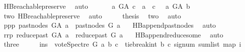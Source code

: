 \begin{isabellebody}
\ HB{}{\isachardot}{\kern0pt}reachable{}{\isacharunderscore}{\kern0pt}preserve\ \isamarkupfalse%
\ auto\isanewline
\ \ \isamarkupfalse%
\ \isamarkupfalse%
\ {\isachardoublequoteopen}\ {\isacharparenleft}{\kern0pt}a\ {\isasymrightarrow}\isactrlsup {\isacharplus}{\kern0pt}\isactrlbsub G{\isacharunderscore}{\kern0pt}A\isactrlesub \ c\ {\isasymor}\ a\ {\isacharequal}{\kern0pt}\ c{\isacharparenright}{\kern0pt}\ {\isasymand}\ {\isacharparenleft}{\kern0pt}{\isasymnot}\ a\ {\isasymrightarrow}\isactrlsup {\isacharplus}{\kern0pt}\isactrlbsub G{\isacharunderscore}{\kern0pt}A\isactrlesub \ b{\isacharparenright}{\kern0pt}{\isachardoublequoteclose}\ \isanewline
\ \ \ \ \isamarkupfalse%
\ two\ HB{}{\isachardot}{\kern0pt}reachable{}{\isacharunderscore}{\kern0pt}preserve\ \isamarkupfalse%
\ auto\isanewline
\ \ \isamarkupfalse%
\ \isamarkupfalse%
\ {\isacharquery}{\kern0pt}thesis\ \isamarkupfalse%
\ two\ \isamarkupfalse%
\ auto\isanewline
{}\isamarkupfalse%
\isanewline
\ \ \isamarkupfalse%
\ ppp{\isacharcolon}{\kern0pt}\ {\isachardoublequoteopen}past{\isacharunderscore}{\kern0pt}nodes\ G{\isacharunderscore}{\kern0pt}A\ a\ {\isacharequal}{\kern0pt}\ past{\isacharunderscore}{\kern0pt}nodes\ G\ a{\isachardoublequoteclose}\ \isamarkupfalse%
\ {}{\isacharparenleft}{\kern0pt}{}{\isacharparenright}{\kern0pt}\ HB{}{\isachardot}{\kern0pt}append{\isacharunderscore}{\kern0pt}past{\isacharunderscore}{\kern0pt}nodes\ \isamarkupfalse%
\ auto\isanewline
\ \ \isamarkupfalse%
\ rrp{\isacharcolon}{\kern0pt}\ {\isachardoublequoteopen}reduce{\isacharunderscore}{\kern0pt}past\ G{\isacharunderscore}{\kern0pt}A\ a\ {\isacharequal}{\kern0pt}\ reduce{\isacharunderscore}{\kern0pt}past\ G\ a{\isachardoublequoteclose}\ \isamarkupfalse%
\ {}{\isacharparenleft}{\kern0pt}{}{\isacharparenright}{\kern0pt}\ HB{}{\isachardot}{\kern0pt}append{\isacharunderscore}{\kern0pt}reduce{\isacharunderscore}{\kern0pt}some\ \isamarkupfalse%
\ auto\isanewline
\ \ \isamarkupfalse%
\ three\isanewline
\ \ \isamarkupfalse%
\ \isamarkupfalse%
\ ins{\isacharcolon}{\kern0pt}\ {\isachardoublequoteopen}\ vote{\isacharunderscore}{\kern0pt}Spectre\ G\ a\ b\ c\ {\isacharequal}{\kern0pt}\ {\isacharparenleft}{\kern0pt}tie{\isacharunderscore}{\kern0pt}break{\isacharunderscore}{\kern0pt}int\ b\ c\ {\isacharparenleft}{\kern0pt}signum\ {\isacharparenleft}{\kern0pt}sum{\isacharunderscore}{\kern0pt}list\ {\isacharparenleft}{\kern0pt}map\ {\isacharparenleft}{\kern0pt}{\isasymlambda}i{\isachardot}{\kern0pt}\isanewline

\end{isabellebody}
